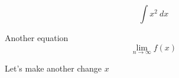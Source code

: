 \documentclass[11pt]{article}
\begin{document}
$$ \int x^2 \ dx $$

Another equation
$$\lim_{n\to\infty}f(x)$$

Let's make another change $x$
\end{document}

